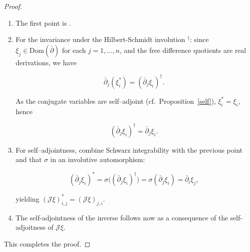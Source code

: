 \documentclass[10pt,a4paper,reqno]{amsart}
\newcommand{\Dom}{\mathrm{Dom}}
\begin{document}
\begin{proof}
\begin{enumerate}
    \item The first point is \cite[Lemma~36]{Dab14}.
    
    \item For the invariance under the Hilbert-Schmidt involution $^\dagger$: since $\xi_j \in \Dom(\bar\partial)$ for each $j=1,\ldots,n$, and the free difference quotients are real derivations, we have
    

\[
      \bar\partial_j(\xi_i^\ast)=(\bar\partial_j\xi_i)^{\dagger}.
    \]


    As the conjugate variables are self--adjoint (cf.\ Proposition~\ref{self}), $\xi_i^\ast=\xi_i$, hence
    

\[
      (\bar\partial_j\xi_i)^{\dagger}=\bar\partial_j\xi_i.
    \]


    
    \item For self--adjointness, combine Schwarz integrability with the previous point and that $\sigma$ in an involutive automorphism:
    

\[
      (\bar\partial_j\xi_i)^\ast=\sigma\big((\bar\partial_j\xi_i)^{\dagger}\big)
      =\sigma(\bar\partial_j\xi_i)=\bar\partial_i\xi_j,
    \]


    yielding $(\mathscr{J}\xi)_{i,j}^\ast=(\mathscr{J}\xi)_{j,i}$.
    \item The self-adjointness of the inverse follows now as a consequence of the self-adjoitness of $\mathscr{J}\xi$.
\end{enumerate}
This completes the proof.
\end{proof}
\end{document}
